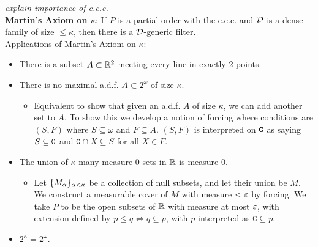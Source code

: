 \documentclass{amsart}
\begin{document}
	\textit{explain importance of c.c.c.}\\
	
	\textbf{Martin's Axiom on $\kappa$}: If $P$ is a partial order with the c.c.c. and $\mathcal{D}$ is a dense family of size $\leq \kappa$, then there is a $\mathcal{D}$-generic filter.\\
	
	\underline{Applications of Martin's Axiom on $\kappa$:}
	 \begin{itemize}
	 	\item There is a subset $A\subset \mathbb{R}^2$ meeting every line in exactly 2 points.
	 	\item There is no maximal a.d.f. $A\subset 2^{\omega}$ of size $\kappa$.
	 	\begin{itemize}
	 		\item Equivalent to show that given an a.d.f. $A$ of size $\kappa$, we can add another set to $A$. To show this we develop a notion of forcing where conditions are $(S,F)$ where $S\subseteq \omega$ and $F\subseteq A$. $(S,F)$ is interpreted on $\tt{G}$ as saying $S\subseteq \tt{G}$ and $\mathtt{G}\cap X\subseteq S$ for all $X\in F$.
	 	\end{itemize}
	 	\item The union of $\kappa$-many measure-0 sets in $\mathbb{R}$ is measure-0.
	 	\begin{itemize}
	 		\item Let $\{M_{\alpha}\}_{\alpha<\kappa}$ be a collection of null subsets, and let their union be $M$. We construct a measurable cover of $M$ with measure $<\varepsilon$ by forcing. We take $P$ to be the open subsets of $\mathbb{R}$ with measure at most $\varepsilon$, with extension defined by $p\leq q \iff q\subseteq p$, with $p$ interpreted as $\mathtt{G}\subseteq p$. 
	 	\end{itemize}
	 	\item $2^{\kappa}=2^{\omega}$.
	 \end{itemize}
	
\end{document}
